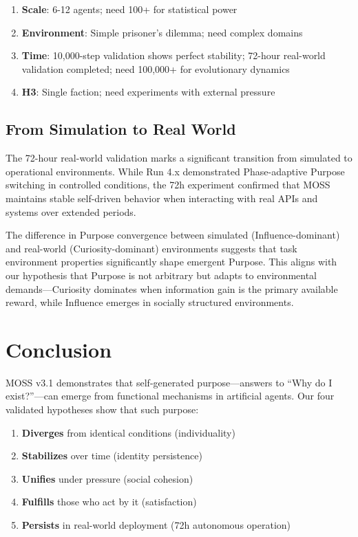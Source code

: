 \documentclass{article}
\begin{document}
\begin{enumerate}
    \item \textbf{Scale}: 6-12 agents; need 100+ for statistical power
    \item \textbf{Environment}: Simple prisoner's dilemma; need complex domains
    \item \textbf{Time}: 10,000-step validation shows perfect stability; 72-hour real-world validation completed; need 100,000+ for evolutionary dynamics
    \item \textbf{H3}: Single faction; need experiments with external pressure
\end{enumerate}

\subsection{From Simulation to Real World}

The 72-hour real-world validation marks a significant transition from simulated to operational environments. While Run 4.x demonstrated Phase-adaptive Purpose switching in controlled conditions, the 72h experiment confirmed that MOSS maintains stable self-driven behavior when interacting with real APIs and systems over extended periods.

The difference in Purpose convergence between simulated (Influence-dominant) and real-world (Curiosity-dominant) environments suggests that task environment properties significantly shape emergent Purpose. This aligns with our hypothesis that Purpose is not arbitrary but adapts to environmental demands—Curiosity dominates when information gain is the primary available reward, while Influence emerges in socially structured environments.

\section{Conclusion}

MOSS v3.1 demonstrates that self-generated purpose—answers to ``Why do I exist?''—can emerge from functional mechanisms in artificial agents. Our four validated hypotheses show that such purpose:

\begin{enumerate}
    \item \textbf{Diverges} from identical conditions (individuality)
    \item \textbf{Stabilizes} over time (identity persistence)
    \item \textbf{Unifies} under pressure (social cohesion)
    \item \textbf{Fulfills} those who act by it (satisfaction)
    \item \textbf{Persists} in real-world deployment (72h autonomous operation)
\end{enumerate}
\end{document}
